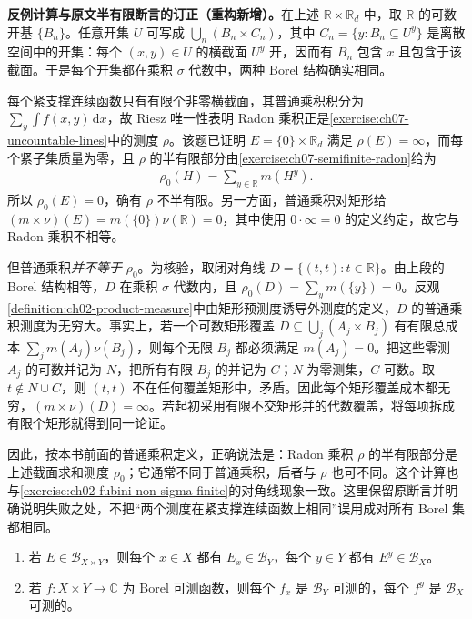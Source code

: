 \documentclass[../../main.tex]{subfiles}
\begin{document}
\begin{remark}
\textbf{反例计算与原文半有限断言的订正（重构新增）。}在上述 $\mathbb R\times\mathbb R_d$ 中，取 $\mathbb R$ 的可数开基 $\{B_n\}$。任意开集 $U$ 可写成 $\bigcup_n(B_n\times C_n)$，其中 $C_n=\{y:B_n\subseteq U^y\}$ 是离散空间中的开集：每个 $(x,y)\in U$ 的横截面 $U^y$ 开，因而有 $B_n$ 包含 $x$ 且包含于该截面。于是每个开集都在乘积 $\sigma$ 代数中，两种 Borel 结构确实相同。

每个紧支撑连续函数只有有限个非零横截面，其普通乘积积分为 $\sum_y\int f(x,y)\,\mathrm dx$，故 Riesz 唯一性表明 Radon 乘积正是\cref{exercise:ch07-uncountable-lines}中的测度 $\rho$。该题已证明 $E=\{0\}\times\mathbb R_d$ 满足 $\rho(E)=\infty$，而每个紧子集质量为零，且 $\rho$ 的半有限部分由\cref{exercise:ch07-semifinite-radon}给为
\begin{align*}
\rho_0(H)=\sum_{y\in\mathbb R}m(H^y).
\end{align*}
所以 $\rho_0(E)=0$，确有 $\rho$ 不半有限。另一方面，普通乘积对矩形给 $(m\times\nu)(E)=m(\{0\})\nu(\mathbb R)=0$，其中使用 $0\cdot\infty=0$ 的定义约定，故它与 Radon 乘积不相等。

但普通乘积\emph{并不等于} $\rho_0$。为核验，取闭对角线 $D=\{(t,t):t\in\mathbb R\}$。由上段的 Borel 结构相等，$D$ 在乘积 $\sigma$ 代数内，且 $\rho_0(D)=\sum_y m(\{y\})=0$。反观\cref{definition:ch02-product-measure}中由矩形预测度诱导外测度的定义，$D$ 的普通乘积测度为无穷大。事实上，若一个可数矩形覆盖 $D\subseteq\bigcup_j(A_j\times B_j)$ 有有限总成本 $\sum_jm(A_j)\nu(B_j)$，则每个无限 $B_j$ 都必须满足 $m(A_j)=0$。把这些零测 $A_j$ 的可数并记为 $N$，把所有有限 $B_j$ 的并记为 $C$；$N$ 为零测集，$C$ 可数。取 $t\notin N\cup C$，则 $(t,t)$ 不在任何覆盖矩形中，矛盾。因此每个矩形覆盖成本都无穷，$(m\times\nu)(D)=\infty$。若起初采用有限不交矩形并的代数覆盖，将每项拆成有限个矩形就得到同一论证。

因此，按本书前面的普通乘积定义，正确说法是：Radon 乘积 $\rho$ 的半有限部分是上述截面求和测度 $\rho_0$；它通常不同于普通乘积，后者与 $\rho$ 也可不同。这个计算也与\cref{exercise:ch02-fubini-non-sigma-finite}的对角线现象一致。这里保留原断言并明确说明失败之处，不把“两个测度在紧支撑连续函数上相同”误用成对所有 Borel 集都相同。
\end{remark}
\begin{lemma}\label{lemma:ch07-borel-sections}
\begin{enumerate}
\item\label{item:ch07-borel-set-sections} 若 $E\in\mathscr B_{X\times Y}$，则每个 $x\in X$ 都有 $E_x\in\mathscr B_Y$，每个 $y\in Y$ 都有 $E^y\in\mathscr B_X$。
\item\label{item:ch07-borel-function-sections} 若 $f:X\times Y\to\mathbb C$ 为 Borel 可测函数，则每个 $f_x$ 是 $\mathscr B_Y$ 可测的，每个 $f^y$ 是 $\mathscr B_X$ 可测的。
\end{enumerate}
\end{lemma}
\end{document}
